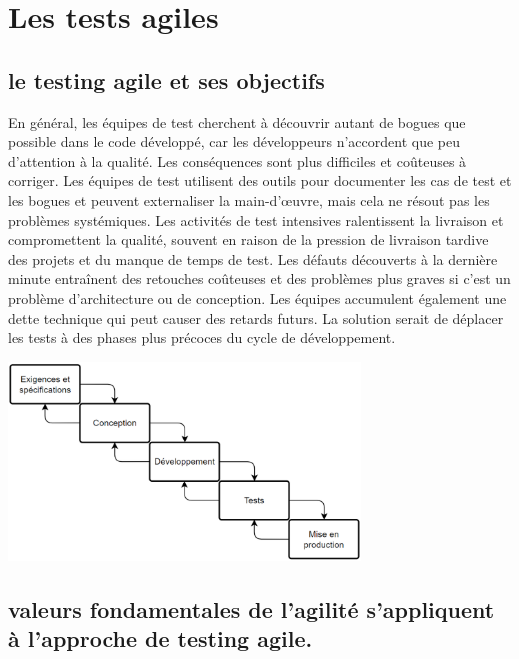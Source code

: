 \chapter{Les tests agiles}
\thispagestyle{fancy}
\section{ le testing agile et ses objectifs}
\label{sec:agiletest}
En général, les équipes de test cherchent à découvrir autant de bogues que possible dans le code développé, car les développeurs n'accordent que peu d'attention à la qualité. Les conséquences sont plus difficiles et coûteuses à corriger. Les équipes de test utilisent des outils pour documenter les cas de test et les bogues et peuvent externaliser la main-d'œuvre, mais cela ne résout pas les problèmes systémiques. Les activités de test intensives ralentissent la livraison et compromettent la qualité, souvent en raison de la pression de livraison tardive des projets et du manque de temps de test. Les défauts découverts à la dernière minute entraînent des retouches coûteuses et des problèmes plus graves si c'est un problème d'architecture ou de conception. Les équipes accumulent également une dette technique qui peut causer des retards futurs. La solution serait de déplacer les tests à des phases plus précoces du cycle de développement.
\begin{center}
    \includegraphics[width=0.7\textwidth]{incremental.png}

\end{center}
\section{valeurs fondamentales de l'agilité s'appliquent à l'approche de testing agile.}
\label{sec:testagile}

